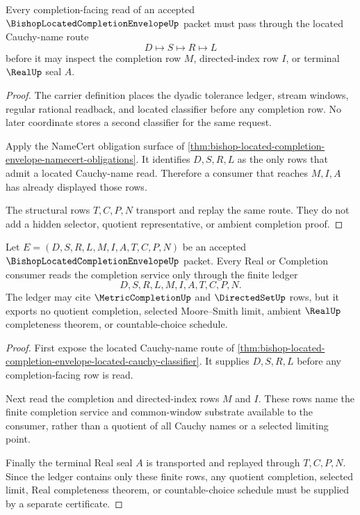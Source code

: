 \begin{theorem}
\label{thm:bishop-located-completion-envelope-located-cauchy-classifier}
Every completion-facing read of an accepted $\BishopLocatedCompletionEnvelopeUp$ packet must pass through the located Cauchy-name route
$$
D \longmapsto S \longmapsto R \longmapsto L
$$
before it may inspect the completion row $M$, directed-index row $I$, or terminal $\RealUp$ seal $A$.
\end{theorem}
\begin{proof}
The carrier definition places the dyadic tolerance ledger, stream windows, regular rational readback, and located classifier before any completion row. No later coordinate stores a second classifier for the same request.

Apply the NameCert obligation surface of \autoref{thm:bishop-located-completion-envelope-namecert-obligations}. It identifies $D,S,R,L$ as the only rows that admit a located Cauchy-name read. Therefore a consumer that reaches $M,I,A$ has already displayed those rows.

The structural rows $T,C,P,N$ transport and replay the same route. They do not add a hidden selector, quotient representative, or ambient completion proof.
\end{proof}

\begin{theorem}
\label{thm:bishop-located-completion-envelope-finite-ledger}
Let $E=(D,S,R,L,M,I,A,T,C,P,N)$ be an accepted $\BishopLocatedCompletionEnvelopeUp$ packet. Every Real or Completion consumer reads the completion service only through the finite ledger
$$
D,S,R,L,M,I,A,T,C,P,N .
$$
The ledger may cite $\MetricCompletionUp$ and $\DirectedSetUp$ rows, but it exports no quotient completion, selected Moore--Smith limit, ambient $\RealUp$ completeness theorem, or countable-choice schedule.
\end{theorem}
\begin{proof}
First expose the located Cauchy-name route of \autoref{thm:bishop-located-completion-envelope-located-cauchy-classifier}. It supplies $D,S,R,L$ before any completion-facing row is read.

Next read the completion and directed-index rows $M$ and $I$. These rows name the finite completion service and common-window substrate available to the consumer, rather than a quotient of all Cauchy names or a selected limiting point.

Finally the terminal Real seal $A$ is transported and replayed through $T,C,P,N$. Since the ledger contains only these finite rows, any quotient completion, selected limit, Real completeness theorem, or countable-choice schedule must be supplied by a separate certificate.
\end{proof}

